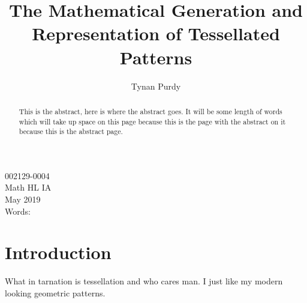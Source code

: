 \documentclass[12pt,letterpaper]{article}
\title{The Mathematical Generation and Representation of Tessellated Patterns}
\author{Tynan Purdy}
\date{\vspace{-5ex}}
\begin{document}
\large
\parindent=0.5in
{\fontsize{12}{14.4}
	{\singlespace
	\maketitle
	\begin{center}
	\vspace{4mm}
	002129-0004 \\
	\vspace{4mm}
	Math HL IA \\
	\vspace{4mm}
	May 2019 \\
	\vspace{4mm}
	Words: \\
	\end{center}
	}
}	

\newpage

\begin{abstract}
This is the abstract, here is where the abstract goes. It will be some length of words which will take up space on this page because this is the page with the abstract on it because this is the abstract page.
\end{abstract}

\newpage
\tableofcontents

\newpage
\section{Introduction}
What in tarnation is tessellation and who cares man. I just like my modern looking geometric patterns.
\begin{lstlisting}[language=javascript]

\end{lstlisting}
\appendix
\end{document}
